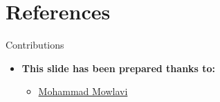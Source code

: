 \documentclass[serif, aspectratio=169]{beamer}
\begin{document}
\section{References}

\begin{frame}{Contributions}
    \begin{itemize}
    \itemsep1em
    \justifying
        \item \textbf{This slide has been prepared thanks to:}
    \begin{itemize}
        \itemsep1em
        \item \href{https://github.com/MohammadMow/}{Mohammad Mowlavi}
    \end{itemize}
    \end{itemize}
\end{frame}

\begin{frame}[allowframebreaks]
    
    
    \nocite{*}
\end{frame}
\end{document}
